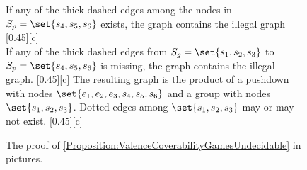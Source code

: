 \documentclass[../../diss.tex]{subfiles}
\begin{document}
\begin{figure}
{{            If any of the thick dashed edges among the nodes in $S_p = \set{s_4, s_5, s_6}$ exists, the graph contains the  illegal graph%
            \label{Figure:ValenceCoverabilityGamesUndecidableProofFour}%
        }%
        [0.45\textwidth][c]%
        {%
        }%
    }%
    \\[0.75em]%
    {%
        \centering%
        \subcaptionbox%
        {%
            If any of the thick dashed edges from $S_g = \set{s_1, s_2, s_3}$ to $S_p = \set{s_4, s_5, s_6}$ is missing, the graph contains the  illegal graph.%
            \label{Figure:ValenceCoverabilityGamesUndecidableProofFive}%
        }%
        [0.45\textwidth][c]%
        {%
        }%
    }%
    \hspace*{0.1\textwidth}%
    {%
        \centering%
        \subcaptionbox%
        {%
            The resulting graph is the product of a pushdown with nodes $\set{e_1,e_2,e_3,s_4,s_5,s_6}$ and a group with nodes $\set{s_1,s_2,s_3}$.
            Dotted edges among $\set{s_1,s_2,s_3}$ may or may not exist.%
            \label{Figure:ValenceCoverabilityGamesUndecidableProofSix}%
        }%
        [0.45\textwidth][c]%
        {%
        }%
    }%
    \caption{The proof of \cref{Proposition:ValenceCoverabilityGamesUndecidable} in pictures.}%
    \label{Figure:ValenceCoverabilityGamesUndecidableProof}%
\end{figure}
\end{document}
